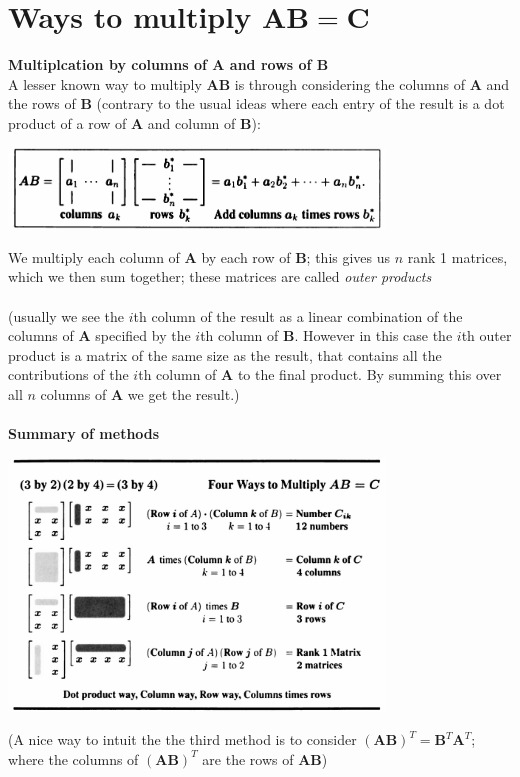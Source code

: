 \documentclass{report}
\begin{document}
\section{Ways to multiply $\bm{AB}=\bm C$}
\textbf{Multiplcation by columns of $\bm A$ and rows of $\bm B$}\\
A lesser known way to multiply $\bm{AB}$ is through considering the columns of $\bm A$ and the rows of $\bm B$ (contrary to the usual ideas where each 
entry of the result is a dot product of a row of $\bm A$ and column of $\bm B$):
\begin{center}
\includegraphics[width=10cm]{3}
\end{center}
We multiply each column of $\bm A$ by each row of $\bm B$; this gives us $n$ rank 1 matrices, which we then sum together; these matrices are called \textit{outer products}\\
\vspace{1mm}\\
(usually we see the $i$th column of the result as a linear combination of the columns of $\bm A$ specified by the $i$th column of $\bm B$. However
in this case the $i$th outer product is a matrix of the same size as the result, that contains all the contributions of the $i$th column of $\bm A$ to the final product.
By summing this over all $n$ columns of $\bm A$ we get the result.)\\
\vspace{1mm}\\
\textbf{Summary of methods}
\begin{center}
\includegraphics[width=10cm]{4}
\end{center}
(A nice way to intuit the the third method is to consider $(\bm{AB})^T=\bm B^T\bm A^T$; where the columns of $(\bm{AB})^T$ are the rows of $\bm{AB}$)
\newpage
\end{document}
